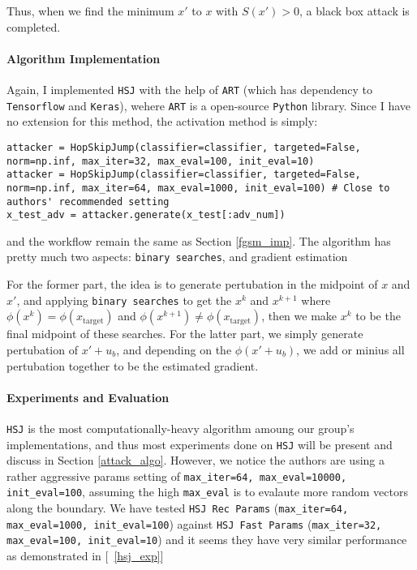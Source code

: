 \documentclass[11pt]{article}
\newcommand{\ilc}{\texttt}
\begin{document}
Thus, when we find the minimum $x'$ to $x$ with $S(x') > 0$, a black box attack is completed.

\paragraph{Algorithm Implementation}

Again, I implemented \ilc{HSJ} with the help of \ilc{ART}\cite{cite:art} (which has dependency to \ilc{Tensorflow} and \ilc{Keras}), wehere \ilc{ART} is a open-source \ilc{Python} library. Since I have no extension for this method, the activation method is simply:

\begin{lstlisting}
attacker = HopSkipJump(classifier=classifier, targeted=False, norm=np.inf, max_iter=32, max_eval=100, init_eval=10)
attacker = HopSkipJump(classifier=classifier, targeted=False, norm=np.inf, max_iter=64, max_eval=1000, init_eval=100) # Close to authors' recommended setting
x_test_adv = attacker.generate(x_test[:adv_num])
\end{lstlisting}

and the workflow remain the same as Section \ref{fgsm_imp}. The algorithm has pretty much two aspects: \ilc{binary searches}, and gradient estimation

For the former part, the idea is to generate pertubation in the midpoint of $x$ and $x'$, and applying  \ilc{binary searches} to get the $x^k$ and $x^{k+1}$ where $\phi(x^k) = \phi(x_{\text{target}})$ and $\phi(x^{k+1}) \neq \phi(x_{\text{target}})$, then we make $x^k$ to be the final midpoint of these searches. For the latter part, we simply generate pertubation of $x' + u_b$, and depending on the $\phi(x' + u_b)$, we add or minius all pertubation together to be the estimated gradient.

\paragraph{Experiments and Evaluation}

\ilc{HSJ} is the most computationally-heavy algorithm amoung our group's implementations, and thus most experiments done on \ilc{HSJ} will be present and discuss in Section \ref{attack_algo}. However, we notice the authors are using a rather aggressive params setting of \ilc{max\_iter=64, max\_eval=10000, init\_eval=100}, assuming the high \ilc{max\_eval} is to evalaute more random vectors along the boundary. We have tested \ilc{HSJ Rec Params} (\ilc{max\_iter=64, max\_eval=1000, init\_eval=100}) against \ilc{HSJ Fast Params} (\ilc{max\_iter=32, max\_eval=100, init\_eval=10}) and it seems they have very similar performance as demonstrated in [\figurename{\ \ref{hsj_exp}}]
\end{document}
